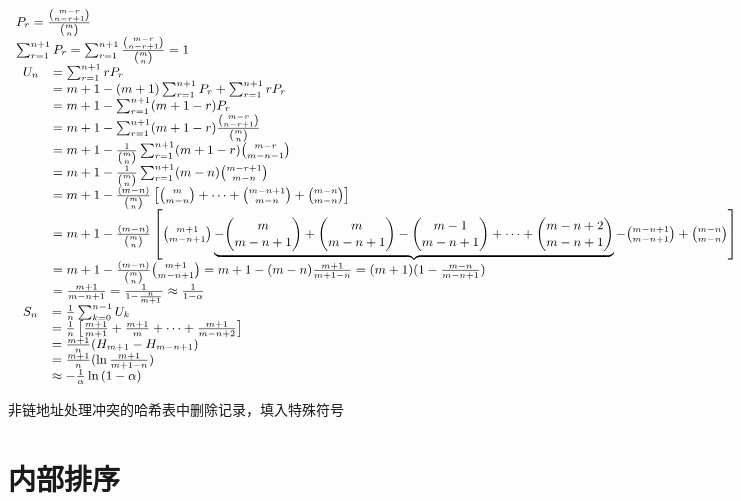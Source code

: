 \documentclass[UTF8]{ctexart}
\newcommand{\mf}[1]{\left( #1\right)}
\newcommand{\mfc}[1]{\left[ #1 \right]}
\newcommand{\ma}[1]{\begin{array}{llll} #1 \end{array}}
\newcommand{\mseq}{\approx }
\begin{document}
$\small\ma{
    P_r=\frac{\binom{m-r}{n-r+1}}{\binom{m}{n}}\\
    \sum_{r=1}^{n+1}P_r=\sum_{r=1}^{n+1}\frac{\binom{m-r}{n-r+1}}{\binom{m}{n}}=1\\
   \ma{
    U_n &=\sum_{r=1}^{n+1}r P_r \\
        &=m+1 - (m+1)\sum_{r=1}^{n+1}P_r+\sum_{r=1}^{n+1}r P_r\\
        &=m+1 -\sum_{r=1}^{n+1}(m+1-r) P_r\\
        &=m+1-\sum_{r=1}^{n+1}(m+1-r) \frac{\binom{m-r}{n-r+1}}{\binom{m}{n}}\\
        &=m+1-\frac{1}{\binom{m}{n}} \sum_{r=1}^{n+1}(m+1-r) \binom{m-r}{m-n-1}\\
        &=m+1-\frac{1}{\binom{m}{n}} \sum_{r=1}^{n+1}(m-n) \binom{m-r+1}{m-n}\\
        &=m+1-\frac{(m-n)}{\binom{m}{n}}\mfc{ \binom{m}{m-n}+\dots+ \binom{m-n+1}{m-n}+\binom{m-n}{m-n} }\\
        &=m+1-\frac{(m-n)}{\binom{m}{n}}\mfc{\binom{m+1}{m-n+1} \underbrace{-\binom{m}{m-n+1} +\binom{m}{m-n+1}-\binom{m-1}{m-n+1} +\dots+ \binom{m-n+2}{m-n+1}} -\binom{m-n+1}{m-n+1} +\binom{m-n}{m-n} }\\
        &=m+1-\frac{(m-n)}{\binom{m}{n}}\binom{m+1}{m-n+1}
        =m+1-(m-n)\frac{m+1}{m+1-n}
        =(m+1)(1-\frac{m-n}{m-n+1})\\
        &=\frac{m+1}{m-n+1}
        =\frac{1}{1-\frac{n}{m+1}} \mseq \frac{1}{1-\alpha}
    
    
    }\\
    \ma{
        S_n&=\frac{1}{n}\sum_{k=0}^{n-1} U_k\\
            &=\frac{1}{n}\mfc{\frac{m+1}{m+1} +\frac{m+1}{m} +\dots+ \frac{m+1}{m-n+2} } \\
            &=\frac{m+1}{n}(H_{m+1}-H_{m-n+1})\\
            &=\frac{m+1}{n}(\ln {\frac{m+1}{m+1-n}} )\\
            &\mseq -\frac{1}{\alpha} \ln \mf{1-\alpha}
    }
}$




非链地址处理冲突的哈希表中删除记录，填入特殊符号













\newpage
\section{内部排序}
\end{document}
